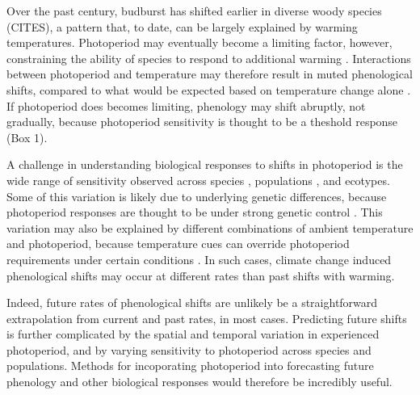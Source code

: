 \documentclass{article}
\begin{document}
\par %
Over the past century, budburst has shifted earlier in diverse woody species (CITES), a pattern that, to date, can be largely explained by warming temperatures. Photoperiod may eventually become a limiting factor, however, constraining the ability of species to respond to additional warming \citep{koerner2010b,vitasse2013, Morin:2010aa,Nienstaedt:1966aa}. Interactions between photoperiod and temperature may therefore result in muted phenological shifts, compared to what would be expected based on temperature change alone \citep{wareing1956,mimura2007,koerner2010b}. If photoperiod does becomes limiting, phenology may shift abruptly, not gradually, because photoperiod sensitivity is thought to be a theshold response (Box 1). 
\par A challenge in understanding biological responses to shifts in photoperiod is the wide range of sensitivity observed across species \citep{Sanz-Perez:2009aa, zohner2016,flynn2018}, populations \citep{tanino2010}, and ecotypes\citep{Howe:1995aa}. Some of this variation is likely due to underlying genetic differences, because photoperiod responses are thought to be under strong genetic control \cite{bradshaw1995,weih2004,keller2011}. This variation may also be explained by different combinations of ambient temperature and photoperiod, because temperature cues can override photoperiod requirements under certain conditions \citep [e.g., during growth cessation][] {tanino2010}. In such cases, climate change induced phenological shifts may occur at different rates than past shifts with warming. 
\par Indeed, future rates of phenological shifts are unlikely be a straightforward extrapolation from current and past rates, in most cases. Predicting future shifts is further complicated by the spatial and temporal variation in experienced photoperiod, and by varying sensitivity to photoperiod across species and populations.  Methods for incoporating photoperiod into forecasting future phenology and other biological responses would therefore be incredibly useful.
\end{document}
